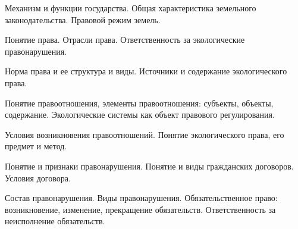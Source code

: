 \documentclass[
	14pt,
	a4paper,
	]
	{scrartcl}
\begin{document}
\vfill

\newpage


\shapk
{}
\setcounter{zad}{0}

\vfill
\z Механизм и функции государства.
 \vfill
\z Общая характеристика земельного законодательства. Правовой режим земель.
 \vfill

\vfill

\newpage


\shapk
{}
\setcounter{zad}{0}

\vfill
\z Понятие права. Отрасли права.
 \vfill
\z Ответственность за экологические правонарушения.
 \vfill

\vfill

\newpage


\shapk
{}
\setcounter{zad}{0}

\vfill
\z Норма права и ее структура и виды.
 \vfill
\z Источники и содержание экологического права.
 \vfill

\vfill

\newpage


\shapk
{}
\setcounter{zad}{0}

\vfill
\z Понятие правоотношения, элементы правоотношения: субъекты, объекты, содержание.
 \vfill
\z Экологические системы как объект правового регулирования.
 \vfill

\vfill

\newpage


\shapk
{}
\setcounter{zad}{0}

\vfill
\z Условия возникновения правоотношений. 
 \vfill
\z Понятие экологического права, его предмет и метод.
 \vfill

\vfill

\newpage


\shapk
{}
\setcounter{zad}{0}

\vfill
\z Понятие и признаки правонарушения.
 \vfill
\z Понятие и виды гражданских договоров. Условия договора.
 \vfill

\vfill

\newpage


\shapk
{}
\setcounter{zad}{0}

\vfill
\z Состав правонарушения. Виды правонарушения.
 \vfill
\z Обязательственное право: возникновение, изменение, прекращение обязательств. Ответственность за неисполнение обязательств.
 \vfill
\end{document}

